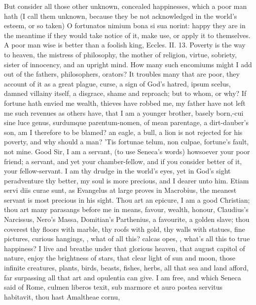{But consider all those other unknown, concealed happinesses, which a
poor man hath (I call them unknown, because they be not acknowledged in
the world's esteem, or so taken) O fortunatos nimium bona si sua
norint: happy they are in the meantime if they would take notice of it,
make use, or apply it to themselves. A poor man wise is better than a
foolish king, Eccles. II. 13. Poverty is the way to heaven,
the mistress of philosophy, the mother of religion, virtue,
sobriety, sister of innocency, and an upright mind. How many such
encomiums might I add out of the fathers, philosophers, orators? It
troubles many that are poor, they account of it as a great plague,
curse, a sign of God's hatred, ipsum scelus, damned villainy itself, a
disgrace, shame and reproach; but to whom, or why? If fortune
hath envied me wealth, thieves have robbed me, my father have not left
me such revenues as others have, that I am a younger brother, basely
born,-cui sine luce genus, surdumque parentum-nomen, of mean parentage,
a dirt-dauber's son, am I therefore to be blamed? an eagle, a bull, a
lion is not rejected for his poverty, and why should a man? 'Tis
fortunae telum, non culpae, fortune's fault, not mine. Good Sir,
I am a servant, (to use Seneca's words) howsoever your poor
friend; a servant, and yet your chamber-fellow, and if you consider
better of it, your fellow-servant. I am thy drudge in the world's eyes,
yet in God's sight peradventure thy better, my soul is more precious,
and I dearer unto him. Etiam servi diis curae sunt, as Evangelus at
large proves in Macrobius, the meanest servant is most precious in his
sight. Thou art an epicure, I am a good Christian; thou art many
parasangs before me in means, favour, wealth, honour, Claudius's
Narcissus, Nero's Massa, Domitian's Parthenius, a favourite, a golden
slave; thou coverest thy floors with marble, thy roofs with gold, thy
walls with statues, fine pictures, curious hangings, \etc{}, what of all
this? calcas opes, \etc{}, what's all this to true happiness? I live and
breathe under that glorious heaven, that august capitol of nature,
enjoy the brightness of stars, that clear light of sun and moon, those
infinite creatures, plants, birds, beasts, fishes, herbs, all that sea
and land afford, far surpassing all that art and opulentia can give. I
am free, and which Seneca said of Rome, culmen liberos texit, sub
marmore et auro postea servitus habitavit, thou hast Amaltheae cornu,
}
